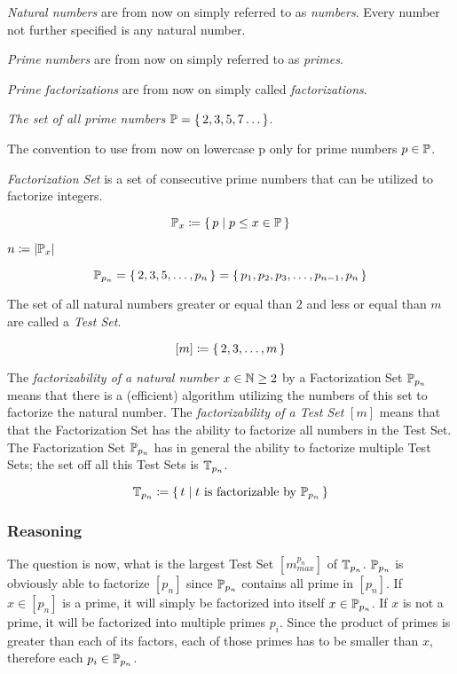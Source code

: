 \documentclass[a4paper,10pt]{article}
\begin{document}
\emph{Natural numbers} are from now on simply referred to as \emph{numbers}.
Every number not further specified is any natural number.

\emph{Prime numbers} are from now on simply referred to as \emph{primes}.

\emph{Prime factorizations} are from now on simply called \emph{factorizations}.

\emph{The set of all prime numbers} $\mathbb{P} = \lbrace \, {2, 3, 5, 7 \dots } \, \rbrace$.

The convention to use from now on lowercase p only for prime numbers $p \in \mathbb{P}$.

\emph{Factorization Set} is a set of consecutive prime numbers that can be utilized to factorize integers.

$$\mathbb{P}_{x} \coloneq \lbrace \, { {p} \;|\; {p \leq x \in \mathbb{P}} } \, \rbrace$$

$n \coloneq |\mathbb{P}_x|$

$$\mathbb{P}_{p_n}
= \lbrace \, {2, 3, 5, \dots, p_n} \, \rbrace
= \lbrace \, {p_1, p_2, p_3, \dots, p_{n-1}, p_n} \, \rbrace$$

The set of all natural numbers greater or equal than $2$ and less or equal than $m$ are called a \emph{Test Set}.

$$[m] \coloneq \lbrace \, {2, 3, \dots, m} \, \rbrace$$

The \emph{factorizability of a natural number} $x \in \mathbb{N} \ge 2$ by a Factorization Set $\mathbb{P}_{p_n}$
means that there is a (efficient) algorithm utilizing the numbers of this set to factorize the natural number.
The \emph{factorizability of a Test Set} $[m]$ means that that the Factorization Set has the ability to
factorize all numbers in the Test Set.
The Factorization Set $\mathbb{P}_{p_n}$ has in general the ability to factorize multiple Test Sets;
the set off all this Test Sets is $\mathbb{T}_{p_n}$.

$$\mathbb{T}_{p_n} \coloneq \lbrace \, { {t} \;|\; {t\text{ is factorizable by }\mathbb{P}_{p_n}} } \, \rbrace$$

\subsubsection*{Reasoning}

The question is now, what is the largest Test Set $[m^{p_n}_{max}]$ of $\mathbb{T}_{p_n}$.
$\mathbb{P}_{p_n}$ is obviously able to factorize $[p_n]$ since $\mathbb{P}_{p_n}$ contains all prime in $[p_n]$.
If $x \in [p_n]$ is a prime, it will simply be factorized into itself $x \in \mathbb{P}_{p_n}$.
If $x$ is not a prime, it will be factorized into multiple primes $p_i$.
Since the product of primes is greater than each of its factors,
each of those primes has to be smaller than $x$, therefore each $p_i \in \mathbb{P}_{p_n}$.
\end{document}
